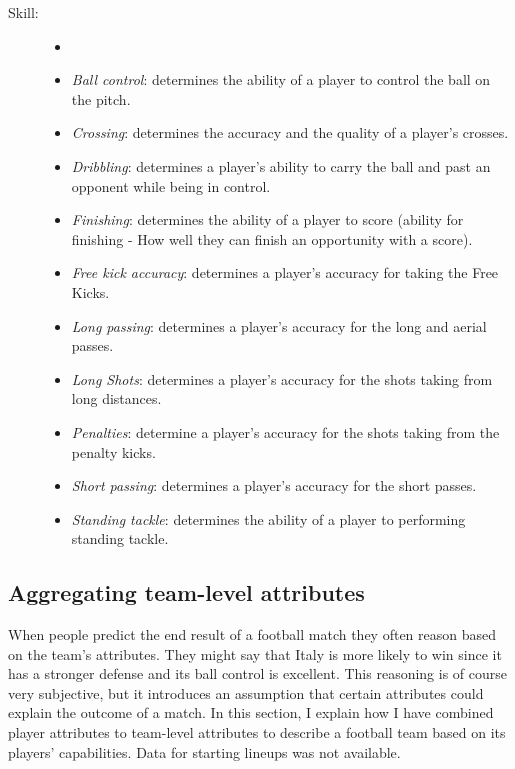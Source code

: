 \begin{description}
\begin{itemize}
    \end{itemize}
    \item[Skill:]
    \begin{itemize}
        \itemsep0.3em
        \item[]
        \item{\textit{Ball control}:} determines the ability of a player to control the ball on the pitch.
        \item{\textit{Crossing}:} determines the accuracy and the quality of a player's crosses.
        \item{\textit{Dribbling}:} determines a player's ability to carry the ball and past an opponent while being in control.
        \item{\textit{Finishing}:} determines the ability of a player to score (ability for finishing - How well they can finish an opportunity with a score).
        \item{\textit{Free kick accuracy}:} determines a player's accuracy for taking the Free Kicks.
        \item{\textit{Long passing}:} determines a player's accuracy for the long and aerial passes.
        \item{\textit{Long Shots}:} determines a player's accuracy for the shots taking from long distances.
        \item{\textit{Penalties}:} determine a player's accuracy for the shots taking from the penalty kicks.
        \item{\textit{Short passing}:} determines a player's accuracy for the short passes.
        \item{\textit{Standing tackle}:} determines the ability of a player to performing standing tackle.

    \end{itemize}

    \end{description}

\subsection{Aggregating team-level attributes}
When people predict the end result of a football match they often reason based on the team's attributes. They might say that Italy is more likely to win since it has a stronger defense and its ball control is excellent. This reasoning is of course very subjective, but it introduces an assumption that certain attributes could explain the outcome of a match. In this section, I explain how I have combined player attributes to team-level attributes to describe a football team based on its players' capabilities. Data for starting lineups was not available.

